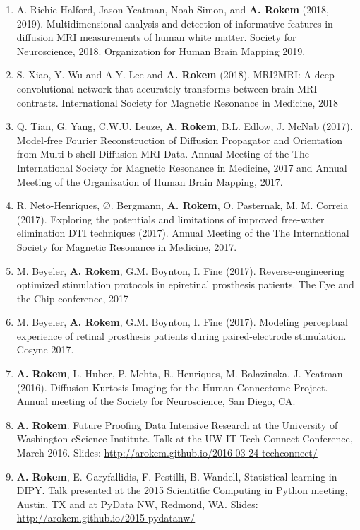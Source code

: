 \documentclass[11pt,fullpage]{article}
\begin{document}
\begin{enumerate}
\item A. Richie-Halford, Jason Yeatman, Noah Simon, and {\bf A. Rokem} (2018, 2019). Multidimensional analysis and detection of informative features in diffusion MRI measurements of human white matter. Society for Neuroscience, 2018. Organization for Human Brain Mapping 2019.

\item S. Xiao, Y. Wu and A.Y. Lee and {\bf A. Rokem} (2018).
MRI2MRI: A deep convolutional network that accurately transforms between brain MRI contrasts.
International Society for Magnetic Resonance in Medicine, 2018

\item Q. Tian, G. Yang, C.W.U. Leuze, {\bf A. Rokem}, B.L. Edlow, J. McNab
(2017). Model-free Fourier Reconstruction of Diffusion Propagator and
Orientation from Multi-b-shell Diffusion MRI Data. Annual Meeting of the The
International Society for Magnetic Resonance in Medicine, 2017 and Annual Meeting of the Organization of Human Brain Mapping, 2017.

\item R. Neto-Henriques, Ø. Bergmann, {\bf A. Rokem}, O. Pasternak, M. M.
Correia (2017).  Exploring the potentials and limitations of improved free-water
elimination DTI techniques (2017). Annual Meeting of the The International
Society for Magnetic Resonance in Medicine, 2017.

\item M. Beyeler, {\bf A. Rokem}, G.M. Boynton, I. Fine (2017).
Reverse-engineering optimized stimulation protocols in epiretinal prosthesis
patients. The Eye and the Chip conference, 2017

\item M. Beyeler, {\bf A. Rokem}, G.M. Boynton, I. Fine (2017). Modeling
perceptual experience of retinal prosthesis patients during paired-electrode
stimulation. Cosyne 2017.

\item {\bf A. Rokem}, L. Huber, P. Mehta, R. Henriques, M. Balazinska, J. Yeatman (2016). Diffusion Kurtosis Imaging for the Human Connectome Project. Annual meeting of the Society for Neuroscience, San Diego, CA.

\item {\bf A. Rokem}. Future Proofing Data Intensive Research at the University of Washington eScience Institute. Talk at the UW IT Tech Connect Conference, March 2016. Slides: \url{http://arokem.github.io/2016-03-24-techconnect/}

\item {\bf A. Rokem}, E. Garyfallidis, F. Pestilli, B. Wandell, Statistical learning in DIPY. Talk presented at the 2015 Scientitfic Computing in Python meeting, Austin, TX and at PyData NW, Redmond, WA. Slides: \url{http://arokem.github.io/2015-pydatanw/}


\end{enumerate}
\end{document}
